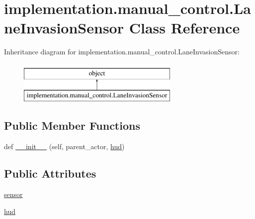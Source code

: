 \hypertarget{classimplementation_1_1manual__control_1_1_lane_invasion_sensor}{}\section{implementation.\+manual\+\_\+control.\+Lane\+Invasion\+Sensor Class Reference}
\label{classimplementation_1_1manual__control_1_1_lane_invasion_sensor}
Inheritance diagram for implementation.\+manual\+\_\+control.\+Lane\+Invasion\+Sensor\+:\begin{figure}[H]
\begin{center}
\leavevmode
\includegraphics[height=2.000000cm]{classimplementation_1_1manual__control_1_1_lane_invasion_sensor}
\end{center}
\end{figure}
\subsection*{Public Member Functions}
\begin{DoxyCompactItemize}
\item 
def \hyperlink{classimplementation_1_1manual__control_1_1_lane_invasion_sensor_a0b38f5a85365c77a41168aa36ec27dea}{\+\_\+\+\_\+init\+\_\+\+\_\+} (self, parent\+\_\+actor, \hyperlink{classimplementation_1_1manual__control_1_1_lane_invasion_sensor_a87ade23d06b806a2e384b182fa682ca7}{hud})
\end{DoxyCompactItemize}
\subsection*{Public Attributes}
\begin{DoxyCompactItemize}
\item 
\hyperlink{classimplementation_1_1manual__control_1_1_lane_invasion_sensor_a0b3804bbe4ff1fd641df8612768d2948}{sensor}
\item 
\hyperlink{classimplementation_1_1manual__control_1_1_lane_invasion_sensor_a87ade23d06b806a2e384b182fa682ca7}{hud}
\end{DoxyCompactItemize}


